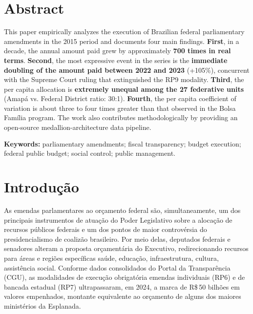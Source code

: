 \documentclass[12pt,a4paper,oneside]{article}
\newcommand{\rs}{R\$\,}
\begin{document}
\section*{Abstract}
\begin{singlespace}\small\noindent
This paper empirically analyzes the execution of Brazilian federal
parliamentary amendments in the 2015 period and
documents four main findings. \textbf{First}, in a decade, the annual
amount paid grew by approximately \textbf{700 times in real terms}.
\textbf{Second}, the most expressive event in the series is the
\textbf{immediate doubling of the amount paid between 2022 and 2023}
(+105\%), concurrent with the Supreme Court ruling that extinguished
the RP9 modality. \textbf{Third}, the per capita allocation is
\textbf{extremely unequal among the 27 federative units} (Amapá vs.
Federal District ratio: 30:1). \textbf{Fourth}, the per capita
coefficient of variation is about three to four times greater than
that observed in the Bolsa Família program. The work also contributes
methodologically by providing an open-source medallion-architecture
data pipeline.

\vspace{0.4cm}\noindent\textbf{Keywords:}
parliamentary amendments; fiscal transparency; budget execution;
federal public budget; social control; public management.
\end{singlespace}

\newpage

\renewcommand{\contentsname}{Sumário}
\tableofcontents

\newpage
\renewcommand{\listfigurename}{Lista de Figuras}
\listoffigures

\vspace{1cm}
\renewcommand{\listtablename}{Lista de Tabelas}
\listoftables

\newpage

\section{Introdução}\label{sec:intro}

As emendas parlamentares ao orçamento federal são, simultaneamente, um
dos principais instrumentos de atuação do Poder Legislativo sobre a
alocação de recursos públicos federais e um dos pontos de maior
controvérsia do presidencialismo de coalizão brasileiro. Por meio
delas, deputados federais e senadores alteram a proposta orçamentária
do Executivo, redirecionando recursos para áreas e regiões específicas
\textemdash{} saúde, educação, infraestrutura, cultura, assistência
social. Conforme dados consolidados do Portal da Transparência (CGU),
as modalidades de execução obrigatória \textemdash{} emendas
individuais (RP6) e de bancada estadual (RP7) \textemdash{}
ultrapassaram, em 2024, a marca de \rs 50 bilhões em valores
empenhados, montante equivalente ao orçamento de alguns dos maiores
ministérios da Esplanada.
\end{document}
